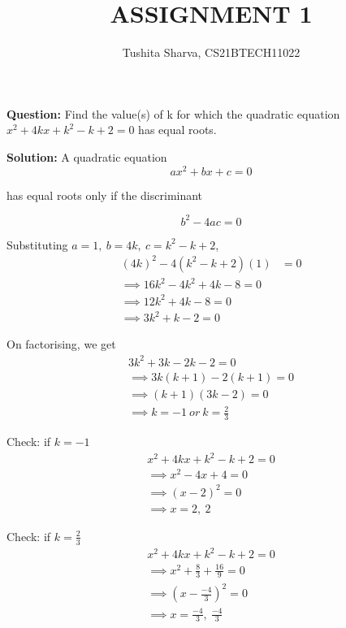 \documentclass[journal,12pt,twocolumn]{IEEEtran}
\title{ASSIGNMENT 1}
\author{Tushita Sharva, CS21BTECH11022}
\begin{document}
\providecommand{\brak}[1]{\ensuremath{\left(#1\right)}}
\newcommand{\question}{\noindent \textbf{Question: }}
\newcommand{\solution}{\noindent \textbf{Solution: }}



\maketitle

\question
Find the value(s) of k for which the quadratic equation $x^2 + 4k x + k^2 - k + 2 = 0$ has equal roots.
\bigskip

\solution
A quadratic equation 
		$$ax^2+bx + c = 0$$

		has equal roots only if 
 the discriminant
		
			$$b^2 - 4a c  = 0$$
			
		Substituting $a = 1,\ b = 4k,\ c = k^2 -k + 2$,
		\begin{align}
		  \brak{4k} ^2 - 4 \brak{k^2 - k + 2}\brak{1} &= 0
		  \\
		  \implies
		  16k^2 - 4k^2+4k-8 = 0
		  \\
		  \implies
		  12k^2 + 4k - 8 = 0
		  \\
		  \implies
		  3k^2 + k - 2 = 0
		\end{align}
		
		On factorising, we get
		\begin{align}
		3k^2 + 3k - 2k - 2 = 0\\
		\implies 3k\brak{k+1}-2\brak{k+1} = 0\\
		\implies \brak{k+1} \brak{3k-2} = 0\\
		\implies k = -1 \ or \ k = \displaystyle\frac{2}{3}
		 \end{align}
		 
		 Check: if $k = -1$
		 \begin{align}
		     x^2 + 4k x + k^2 - k + 2 = 0\\
		     \implies x^2 - 4x + 4 = 0\\
		     \implies \brak{x-2}^2= 0\\
		     \implies x = 2 ,\ 2
		 \end{align}
		 
		 Check: if $k = \displaystyle\frac{2}{3}$
		 \begin{align}
		     x^2 + 4k x + k^2 - k + 2 = 0\\
		     \implies x^2 + \frac{8}{3} + \frac{16}{9} = 0\\
		     \implies \brak{x-\frac{-4}{3}}^2= 0\\
		     \implies x = \displaystyle\frac{-4}{3} ,\ \displaystyle\frac{-4}{3}
		 \end{align}
		 
\end{document}
